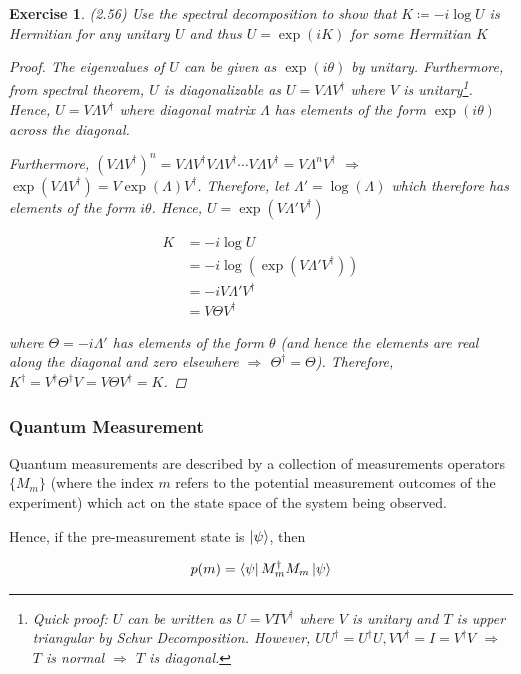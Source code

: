 \documentclass[11pt]{article}
\newcommand\0{\mathbf{0}}
\newcommand\<{\langle}
\renewcommand\>{\rangle}
\renewcommand\implies{\Rightarrow}
\newtheorem{exercise}[theorem]{Exercise}
\begin{document}
\begin{exercise}
(2.56) Use the spectral decomposition to show that $K \coloneqq -i\log U$ is Hermitian for any unitary $U$ and thus $U = \exp(iK)$ for some Hermitian $K$
\begin{proof}
	The eigenvalues of $U$ can be given as $\exp(i\theta)$ by unitary. Furthermore, from spectral theorem, $U$ is diagonalizable as $U = V \Lambda V^\dag$ where $V$ is unitary\footnote{Quick proof: $U$ can be written as $U=VTV^\dag$ where $V$ is unitary and $T$ is upper triangular by Schur Decomposition. However, $UU^\dag = U^\dag U, VV^\dag = I = V^\dag V$ $\implies$ $T$ is normal $\implies$ $T$ is diagonal.}. Hence, $U = V \Lambda V^\dag$ where diagonal matrix $\Lambda$ has elements of the form $\exp(i\theta)$ across the diagonal. 
	
	Furthermore, $(V\Lambda V^\dag)^n = V\Lambda V^\dag V\Lambda V^\dag\cdots V\Lambda V^\dag = V\Lambda^n V^\dag$ $\implies$ $\exp(V \Lambda V^\dag) = V \exp(\Lambda) V^\dag$. Therefore, let $\Lambda' = \log(\Lambda)$ which therefore has elements of the form $i\theta$. Hence, $U = \exp(V \Lambda' V^\dag)$ 
	
	\begin{align*}
		K &= -i\log U \\
		&= -i\log (\exp(V \Lambda' V^\dag)) \\
		&= -iV \Lambda' V^\dag \\
		&= V\Theta V^\dag
	\end{align*}

where $\Theta = -i\Lambda'$ has elements of the form $\theta$ (and hence the elements are real along the diagonal and zero elsewhere $\implies$ $\Theta^\dag = \Theta$). Therefore, $K^\dag = V^\dag\Theta^\dag V = V\Theta V^\dag = K$.
\end{proof}
\end{exercise}

\subsubsection{Quantum Measurement}\label{qmeas}

Quantum measurements are described by a collection of measurements operators $\{ M_m \}$ (where the index $m$ refers to the potential measurement outcomes of the experiment) which act on the state space of the system being observed. 

Hence, if the pre-measurement state is $\ket{\psi}$, then 

\begin{align*}
	p(m) = \bra{\psi} M_m^\dagger M_m \ket{\psi}
\end{align*}
\end{document}
